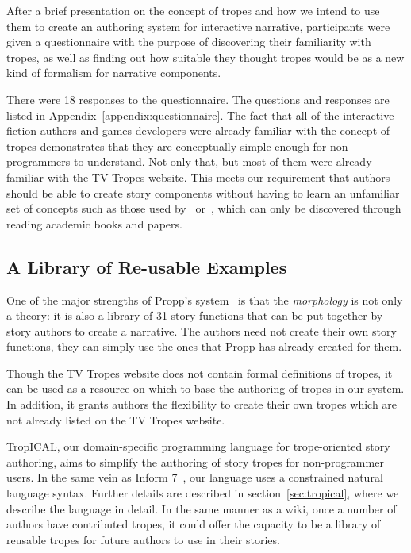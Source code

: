 \documentclass[11pt]{report}
\begin{document}
After a brief presentation on the concept of tropes and how we intend to use
them to create an authoring system for interactive narrative, participants were
given a questionnaire with the purpose of discovering their familiarity with
tropes, as well as finding out how suitable they thought tropes would be as a
new kind of formalism for narrative components.

There were 18 responses to the questionnaire. The questions and responses are
listed in Appendix~\ref{appendix:questionnaire}. The fact that all of the interactive fiction authors and games developers were
already familiar with the concept of tropes demonstrates that they are
conceptually simple enough for non-programmers to understand. Not only that, but
most of them were already familiar with the TV Tropes website. This meets our
requirement that authors should be able to create story components without
having to learn an unfamiliar set of concepts such as those used by~\citet{propp1968morphology}
or~\citet{lehnert1981plot}, which can only be discovered through reading
academic books and papers.

\subsection{A Library of Re-usable Examples}

One of the major strengths of Propp's system~\citep{propp1968morphology} is that
the \emph{morphology} is not only a theory: it is also a library of 31 story functions
that can be put together by story authors to create a narrative. The authors
need not create their own story functions, they can simply use the ones that
Propp has already created for them.

Though the TV Tropes website does not contain formal definitions of tropes, it
can be used as a resource on which to base the authoring of tropes in our system.
In addition, it grants authors the flexibility to create their own tropes which are not already listed on the
TV Tropes website.

TropICAL, our domain-specific programming language for trope-oriented story
authoring, aims to simplify the authoring of story tropes for non-programmer users.
In the same vein as Inform 7~\citep{reed2010creating}, our language uses a
constrained natural language syntax. Further details are described in
section~\ref{sec:tropical}, where we describe the language in detail. In the same manner as a wiki, once a number of authors have contributed tropes,
it could offer the capacity to be a library of reusable tropes for future authors to use in
their stories.
\end{document}
